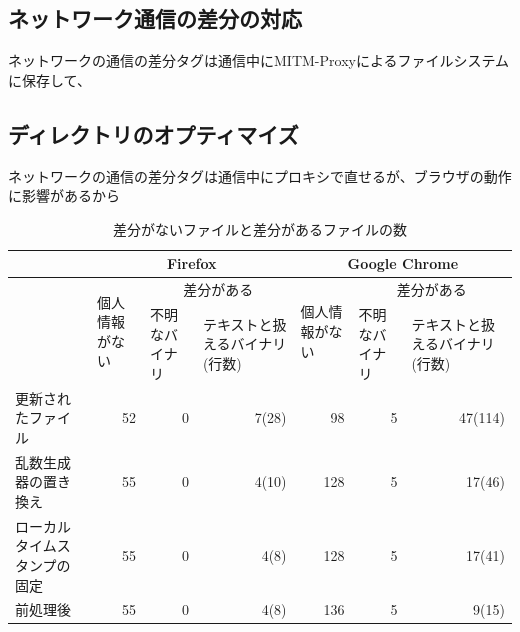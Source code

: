 \documentclass[a4paper,twocolumn,10pt]{jarticle}
\begin{document}
\subsection{ネットワーク通信の差分の対応}
ネットワークの通信の差分タグは通信中にMITM-Proxyによるファイルシステムに保存して、
\subsection{ディレクトリのオプティマイズ}
ネットワークの通信の差分タグは通信中にプロキシで直せるが、ブラウザの動作に影響があるから







 
 
\begin{table}[ht]
\caption{差分がないファイルと差分があるファイルの数}
\centering
\begin{tabular}{|p{2cm}|l|p{1.9cm}|p{1.9cm}|l|p{1.9cm}|p{1.9cm}|}
\hline
&\multicolumn{3}{|c|}{\footnotesize{Firefox}}&\multicolumn{3}{c|}{\footnotesize{Google Chrome}}\\
\hline
&\multirow{2}{1.5cm}{\footnotesize{個人情報がない}} &
\multicolumn{2}{c|}{\footnotesize{差分がある}} &\multirow{2}{1.5cm}{\footnotesize{個人情報がない}}&
\multicolumn{2}{c|}{\footnotesize{差分がある}} \\
\cline{3-4}\cline{6-7}
  & & \footnotesize{不明なバイナリ} & \footnotesize{テキストと扱えるバイナリ(行数)}& &\footnotesize{不明なバイナリ} & \footnotesize{テキストと扱えるバイナリ(行数)} \\
\hline
\footnotesize{更新されたファイル}&\multicolumn{1}{r|}{\footnotesize{52}}&\multicolumn{1}{r|}{\footnotesize{0}}&\multicolumn{1}{r|}{\footnotesize{7(28)}}  & \multicolumn{1}{r|}{\footnotesize{98}} & \multicolumn{1}{r|}{\footnotesize{5}} & \multicolumn{1}{r|}{\footnotesize{47(114)}} \\
\hline
\footnotesize{乱数生成器の置き換え}&\multicolumn{1}{r|}{\footnotesize{55}}&\multicolumn{1}{r|}{\footnotesize{0}}&\multicolumn{1}{r|}{\footnotesize{4(10)} }& \multicolumn{1}{r|}{\footnotesize{128} }& \multicolumn{1}{r|}{\footnotesize{5} }& \multicolumn{1}{r|}{\footnotesize{17(46)}} \\
\hline
\footnotesize{ローカルタイムスタンプの固定}&\multicolumn{1}{r|}{\footnotesize{55}}&\multicolumn{1}{r|}{\footnotesize{0}}&\multicolumn{1}{r|}{\footnotesize{4(8)} }&  \multicolumn{1}{r|}{\footnotesize{128} }& \multicolumn{1}{r|}{\footnotesize{5} }&\multicolumn{1}{r|}{\footnotesize{17(41) }}\\
\hline
\footnotesize{前処理後}&\multicolumn{1}{r|}{\footnotesize{55}}&\multicolumn{1}{r|}{\footnotesize{0}}&\multicolumn{1}{r|}{\footnotesize{4(8)}} &\multicolumn{1}{r|}{ \footnotesize{136} }& \multicolumn{1}{r|}{\footnotesize{5} }&\multicolumn{1}{r|}{\footnotesize{9(15)}}\\
\hline
\end{tabular}
\label{fig:result}
\end{table}
\end{document}
